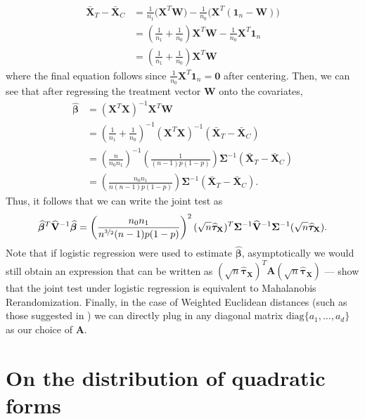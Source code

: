 \documentclass[11pt,twoside]{article}
\theoremstyle{definition}
\theoremstyle{remark}
\begin{document}
\begin{align*}
    \bar{\mathbf{X}}_T - \bar{\mathbf{X}}_C &= \frac{1}{n_1} \Big( \mathbf{X}^T \mathbf{W} \Big) - \frac{1}{n_0} \Big( \mathbf{X}^T(\mathbf{1}_n - \mathbf{W}) \Big) \\
    &= \left(\frac{1}{n_1} + \frac{1}{n_0} \right) \mathbf{X}^T \mathbf{W} - \frac{1}{n_0} \mathbf{X}^T\mathbf{1}_n \\
    &= \left(\frac{1}{n_1} + \frac{1}{n_0} \right) \mathbf{X}^T \mathbf{W} 
\end{align*}
where the final equation follows since $\frac{1}{n_0} \mathbf{X}^T\mathbf{1}_n = \mathbf{0}$ after centering. Then, we can see that after regressing the treatment vector $\mathbf{W}$ onto the covariates,
\begin{align*}
    \widehat{\bm{\beta}} &= (\mathbf{X}^T \mathbf{X})^{-1} \mathbf{X}^T \mathbf{W} \\
    &=   \left(\frac{1}{n_1} + \frac{1}{n_0} \right)^{-1}(\mathbf{X}^T \mathbf{X})^{-1} (\bar{\mathbf{X}}_T - \bar{\mathbf{X}}_C) \\
    &= \left(\frac{n}{n_0 n_1} \right)^{-1} \left(\frac{1}{(n-1)p(1-p)} \right)\mathbf{\Sigma}^{-1} (\bar{\mathbf{X}}_T - \bar{\mathbf{X}}_C) \\
    &=  \left(\frac{n_0 n_1}{n(n-1)p(1-p)} \right)\mathbf{\Sigma}^{-1} (\bar{\mathbf{X}}_T - \bar{\mathbf{X}}_C).
\end{align*}
Thus, it follows that we can write the joint test as
\begin{align*}
    \widehat{\bm{\beta}}^T \widehat{\mathbf{V}}^{-1}\widehat{\bm{\beta}} = \left(\frac{n_0 n_1}{n^{\nicefrac{3}{2}}(n-1)p(1-p)} \right)^2 (\sqrt{n} \widehat{\bm{\tau}}_{\mathbf{X}})^T \mathbf{\Sigma}^{-1} \widehat{\mathbf{V}}^{-1} \mathbf{\Sigma}^{-1} (\sqrt{n} \widehat{\bm{\tau}}_{\mathbf{X}}).
\end{align*}
Note that if logistic regression were used to estimate $\widehat{\bm{\beta}}$, asymptotically we would still obtain an expression that can be written as $(\sqrt{n} \widehat{\bm{\tau}}_{\mathbf{X}})^T \mathbf{A} (\sqrt{n} \widehat{\bm{\tau}}_{\mathbf{X}})$ --- \cite{zhao2021no} show that the joint test under logistic regression is equivalent to Mahalanobis Rerandomization. Finally, in the case of Weighted Euclidean distances (such as those suggested in \cite{lu2023design}) we can directly plug in any diagonal matrix $\text{diag}\{a_1, \ldots, a_d\}$ as our choice of $\mathbf{A}$. 



\section{On the distribution of quadratic forms} \label{quad_form_dist_section}
\end{document}
